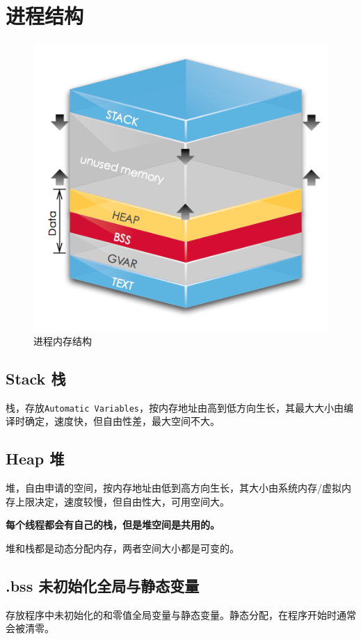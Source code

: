 \documentclass[UTF8,a4paper,12pt]{ctexbook} %
\begin{document}
	\section{进程结构}
		\begin{figure}[htbp]
			\centering
			\includegraphics[scale=0.7]{processMem.png}
			\caption{进程内存结构}
		\end{figure}
		
		\subsection{Stack 栈}
			栈，存放\verb|Automatic Variables|，按内存地址由高到低方向生长，其最大大小由编译时确定，速度快，但自由性差，最大空间不大。
		
		\subsection{Heap 堆}
			堆，自由申请的空间，按内存地址由低到高方向生长，其大小由系统内存/虚拟内存上限决定，速度较慢，但自由性大，可用空间大。 
			
			\textbf{每个线程都会有自己的栈，但是堆空间是共用的。}
			
			堆和栈都是动态分配内存，两者空间大小都是可变的。
		\subsection{.bss 未初始化全局与静态变量}
			存放程序中未初始化的和零值全局变量与静态变量。静态分配，在程序开始时通常会被清零。
			
\end{document}
